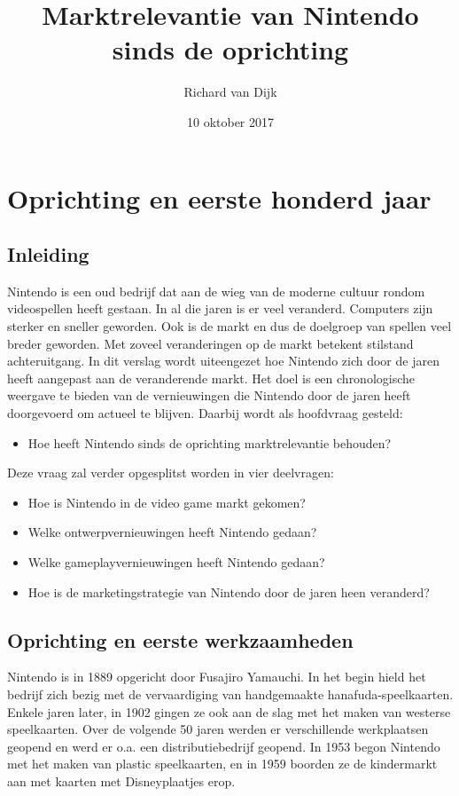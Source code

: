 \documentclass{article}
\title{Marktrelevantie van Nintendo sinds de oprichting}
\date{10 oktober 2017}
\author{Richard van Dijk}
\begin{document}
\maketitle





\section{Oprichting en eerste honderd jaar}
\subsection{Inleiding}

Nintendo is een oud bedrijf dat aan de wieg van de moderne cultuur rondom videospellen heeft gestaan. In al die jaren is er veel veranderd. Computers zijn sterker en sneller geworden. Ook is de markt en dus de doelgroep van spellen veel breder geworden. Met zoveel veranderingen op de markt betekent stilstand achteruitgang. In dit verslag wordt uiteengezet hoe Nintendo zich door de jaren heeft aangepast aan de veranderende markt. Het doel is een chronologische weergave te bieden van de vernieuwingen die Nintendo door de jaren heeft doorgevoerd om actueel te blijven. Daarbij wordt als hoofdvraag gesteld:
\begin{itemize} \item Hoe heeft Nintendo sinds de oprichting marktrelevantie behouden? \end{itemize}
Deze vraag zal verder opgesplitst worden in vier deelvragen:
\begin{itemize}
\item Hoe is Nintendo in de video game markt gekomen?
\item Welke ontwerpvernieuwingen heeft Nintendo gedaan?
\item Welke gameplayvernieuwingen heeft Nintendo gedaan?
\item Hoe is de marketingstrategie van Nintendo door de jaren heen veranderd?
\end{itemize}

\subsection{Oprichting en eerste werkzaamheden}
Nintendo is in 1889 opgericht door Fusajiro Yamauchi. In het begin hield het bedrijf zich bezig met de vervaardiging van handgemaakte hanafuda-speelkaarten. Enkele jaren later, in 1902 gingen ze ook aan de slag met het maken van westerse speelkaarten. Over de volgende 50 jaren werden er verschillende werkplaatsen geopend en werd er o.a. een distributiebedrijf geopend. In 1953 begon Nintendo met het maken van plastic speelkaarten, en in 1959 boorden ze de kindermarkt aan met kaarten met Disneyplaatjes erop. 
\end{document}
